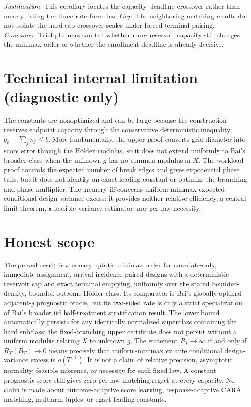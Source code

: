 \documentclass{article}
\begin{document}
\par\smallskip\noindent \textit{Justification.} This corollary locates the capacity--deadline crossover rather than merely listing the three rate formulas. \textit{Gap.} The neighboring matching results do not isolate the hard-cap crossover scales under forced terminal pairing. \textit{Consumer.} Trial planners can tell whether more reservoir capacity still changes the minimax order or whether the enrollment deadline is already decisive.

\section*{Technical internal limitation (diagnostic only)}

The constants are nonoptimized and can be large because the construction reserves endpoint capacity through the conservative deterministic inequality \(q_0+\sum_j n_j\le b\). More fundamentally, the upper proof converts grid diameter into score error through the Hölder modulus, so it does not extend uniformly to Bai's broader class when the unknown \(g\) has no common modulus in \(X\). The workload proof controls the expected number of break edges and gives exponential phase tails, but it does not identify an exact leading constant or optimize the branching and phase multiplier. The memory iff concerns uniform-minimax expected conditional design-variance excess: it provides neither relative efficiency, a central limit theorem, a feasible variance estimator, nor per-law necessity.

\section{Honest scope}

The proved result is a nonasymptotic minimax order for covariate-only, immediate-assignment, arrival-incidence paired designs with a deterministic reservoir cap and exact terminal emptying, uniformly over the stated bounded-density, bounded-outcome Hölder class. Its comparator is Bai's globally optimal adjacent-\(g\) prognostic oracle, but its two-sided rate is only a strict specialization of Bai's broader iid half-treatment stratification result. The lower bound automatically persists for any identically normalized superclass containing the hard subclass; the fixed-branching upper certificate does not persist without a uniform modulus relating \(X\) to unknown \(g\). The statement \(B_T\to\infty\) if and only if \(R_T(B_T)\to0\) means precisely that uniform-minimax ex ante conditional design-variance excess is \(o(T^{-1})\). It is not a claim of relative precision, asymptotic normality, feasible inference, or necessity for each fixed law. A constant prognostic score still gives zero per-law matching regret at every capacity. No claim is made about outcome-adaptive score learning, response-adaptive CARA matching, multiarm tuples, or exact leading constants.
\end{document}
